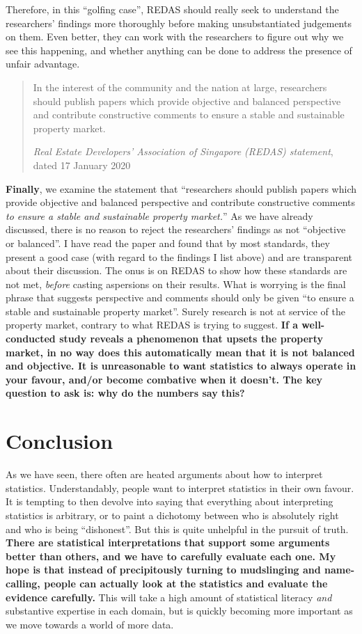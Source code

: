 \documentclass[openany]{book}
\begin{document}
Therefore, in this ``golfing case'', REDAS should really seek to
understand the researchers' findings more thoroughly before making
unsubstantiated judgements on them. Even better, they can work with the
researchers to figure out why we see this happening, and whether
anything can be done to address the presence of unfair advantage.

\begin{quote}
In the interest of the community and the nation at large, researchers
should publish papers which provide objective and balanced perspective
and contribute constructive comments to ensure a stable and sustainable
property market.

\emph{Real Estate Developers' Association of Singapore (REDAS)
statement}, dated 17 January 2020
\end{quote}

\textbf{Finally}, we examine the statement that ``researchers should
publish papers which provide objective and balanced perspective and
contribute constructive comments \emph{to ensure a stable and
sustainable property market.}'' As we have already discussed, there is
no reason to reject the researchers' findings as not ``objective or
balanced''. I have read the paper and found that by most standards, they
present a good case (with regard to the findings I list above) and are
transparent about their discussion. The onus is on REDAS to show how
these standards are not met, \emph{before} casting aspersions on their
results. What is worrying is the final phrase that suggests perspective
and comments should only be given ``to ensure a stable and sustainable
property market''. Surely research is not at service of the property
market, contrary to what REDAS is trying to suggest. \textbf{If a
well-conducted study reveals a phenomenon that upsets the property
market, in no way does this automatically mean that it is not balanced
and objective. It is unreasonable to want statistics to always operate
in your favour, and/or become combative when it doesn't. The key
question to ask is: why do the numbers say this?}

\section{Conclusion}\label{conclusion-4}

As we have seen, there often are heated arguments about how to interpret
statistics. Understandably, people want to interpret statistics in their
own favour. It is tempting to then devolve into saying that everything
about interpreting statistics is arbitrary, or to paint a dichotomy
between who is absolutely right and who is being ``dishonest''. But this
is quite unhelpful in the pursuit of truth. \textbf{There are
statistical interpretations that support some arguments better than
others, and we have to carefully evaluate each one. My hope is that
instead of precipitously turning to mudslinging and name-calling, people
can actually look at the statistics and evaluate the evidence
carefully.} This will take a high amount of statistical literacy
\emph{and} substantive expertise in each domain, but is quickly becoming
more important as we move towards a world of more data.
\end{document}
